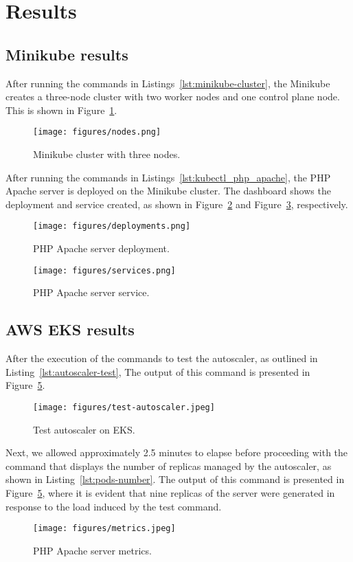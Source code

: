 \section{Results}
\subsection{Minikube results}
After running the commands in Listings~\ref{lst:minikube-cluster}, the Minikube creates a three-node cluster with two worker nodes and one control plane node.
This is shown in Figure~\ref{fig:minikube-cluster}.

\begin{figure}[htbp]
  \centering
  \texttt{[image: figures/nodes.png]}
  \caption{Minikube cluster with three nodes.}
  \label{fig:minikube-cluster}
\end{figure}

After running the commands in Listings~\ref{lst:kubectl_php_apache}, the PHP Apache server is deployed on the Minikube cluster.
The dashboard shows the deployment and service created, as shown in Figure~\ref{fig:deployments} and Figure~\ref{fig:services}, respectively.

\begin{figure}[htbp]
  \centering
  \texttt{[image: figures/deployments.png]}
  \caption{PHP Apache server deployment.}
  \label{fig:deployments}
\end{figure}

\begin{figure}[htbp]
  \centering
  \texttt{[image: figures/services.png]}
  \caption{PHP Apache server service.}
  \label{fig:services}
\end{figure}

\subsection{AWS EKS results}

After the execution of the commands to test the autoscaler, as outlined in Listing~\ref{lst:autoscaler-test}, The output of this command is presented in Figure~\ref{fig:metrics}.

\begin{figure}[htbp]
  \centering
  \texttt{[image: figures/test-autoscaler.jpeg]}
  \caption{Test autoscaler on EKS.}
  \label{fig:test-autoscaler}
\end{figure}

Next, we allowed approximately 2.5 minutes to elapse before proceeding with the command that displays the number of replicas managed by the autoscaler, as shown in Listing~\ref{lst:pods-number}. The output of this command is presented in Figure~\ref{fig:metrics}, where it is evident that nine replicas of the server were generated in response to the load induced by the test command.

\begin{figure}[htbp]
  \centering
  \texttt{[image: figures/metrics.jpeg]}
  \caption{PHP Apache server metrics.}
  \label{fig:metrics}
\end{figure}
